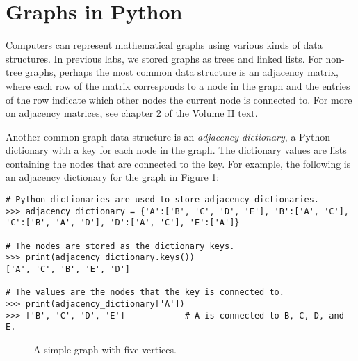 \label{lab:SixDegreesKevinBacon}


\section*{Graphs in Python} %

Computers can represent mathematical graphs using various kinds of data structures.
In previous labs, we stored graphs as trees and linked lists.
For non-tree graphs, perhaps the most common data structure is an adjacency matrix, where each row of the matrix corresponds to a node in the graph and the entries of the row indicate which other nodes the current node is connected to.
For more on adjacency matrices, see chapter 2 of the Volume II text.

Another common graph data structure is an \emph{adjacency dictionary}, a Python dictionary with a key for each node in the graph.
The dictionary values are lists containing the nodes that are connected to the key.
For example, the following is an adjacency dictionary for the graph in Figure \ref{fig:simple_graph}:

\begin{lstlisting}
# Python dictionaries are used to store adjacency dictionaries.
>>> adjacency_dictionary = {'A':['B', 'C', 'D', 'E'], 'B':['A', 'C'],
'C':['B', 'A', 'D'], 'D':['A', 'C'], 'E':['A']}

# The nodes are stored as the dictionary keys.
>>> print(adjacency_dictionary.keys())
['A', 'C', 'B', 'E', 'D']

# The values are the nodes that the key is connected to.
>>> print(adjacency_dictionary['A'])
>>> ['B', 'C', 'D', 'E']            # A is connected to B, C, D, and E.
\end{lstlisting}

\begin{figure}
\centering
{}
\caption{A simple graph with five vertices.}
\label{fig:simple_graph}
\end{figure}

